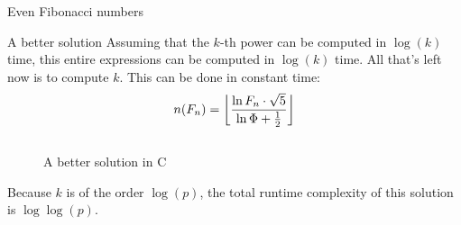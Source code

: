 \documentclass[main.tex]{subfiles}
\begin{document}
\begin{prob}{2}{Even Fibonacci numbers}
\begin{solutions}
\begin{solution}{A better solution}
      Assuming that the $k$-th power can be computed in $\log(k)$ time, this entire expressions can be computed in $\log(k)$ time.
      All that's left now is to compute $k$.
      This can be done in constant time:
      \[ n(F_n) = \floor*{\frac{\ln{F_n \cdot \sqrt{5}}}{\ln{\Phi}+\frac{1}{2}}} \]

      \begin{figure}[H]
        \inputminted[firstline=18, lastline=29]{c}{\sol{002}{c}/solution.c}
        \caption{A better solution in C}
      \end{figure}

      Because $k$ is of the order $\log(p)$, the total runtime complexity of this solution is $\log\log(p)$.
    \end{solution}
  \end{solutions}
\end{prob}
\end{document}
